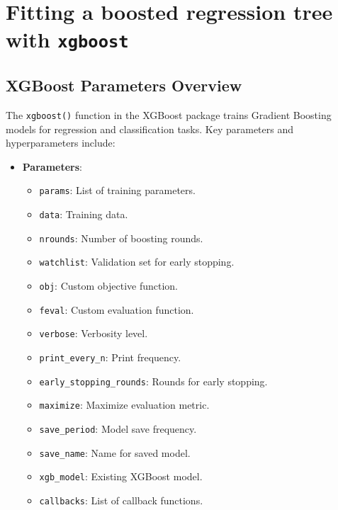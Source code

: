\documentclass[
  letterpaper,
  DIV=11,
  numbers=noendperiod,
  oneside]{scrartcl}
\providecommand{\tightlist}{%
  \setlength{\itemsep}{0pt}\setlength{\parskip}{0pt}}\usepackage{longtable,booktabs,array}
\begin{document}
\section{\texorpdfstring{Fitting a boosted regression tree with
\texttt{xgboost}}{Fitting a boosted regression tree with xgboost}}\label{fitting-a-boosted-regression-tree-with-xgboost}

\subsection{XGBoost Parameters
Overview}\label{xgboost-parameters-overview}

The \texttt{xgboost()} function in the XGBoost package trains Gradient
Boosting models for regression and classification tasks. Key parameters
and hyperparameters include:

\begin{itemize}
\tightlist
\item
  \textbf{Parameters}:

  \begin{itemize}
  \tightlist
  \item
    \texttt{params}: List of training parameters.
  \item
    \texttt{data}: Training data.
  \item
    \texttt{nrounds}: Number of boosting rounds.
  \item
    \texttt{watchlist}: Validation set for early stopping.
  \item
    \texttt{obj}: Custom objective function.
  \item
    \texttt{feval}: Custom evaluation function.
  \item
    \texttt{verbose}: Verbosity level.
  \item
    \texttt{print\_every\_n}: Print frequency.
  \item
    \texttt{early\_stopping\_rounds}: Rounds for early stopping.
  \item
    \texttt{maximize}: Maximize evaluation metric.
  \item
    \texttt{save\_period}: Model save frequency.
  \item
    \texttt{save\_name}: Name for saved model.
  \item
    \texttt{xgb\_model}: Existing XGBoost model.
  \item
    \texttt{callbacks}: List of callback functions.
  \end{itemize}
\end{itemize}
\end{document}
